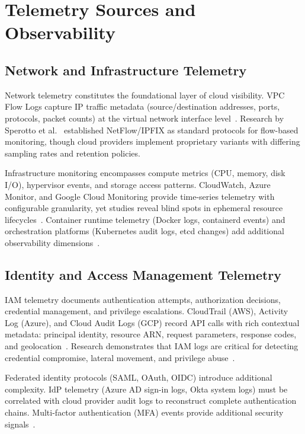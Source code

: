 \section{Telemetry Sources and Observability}\label{sec:lit-telemetry}
\subsection{Network and Infrastructure Telemetry}
Network telemetry constitutes the foundational layer of cloud visibility. VPC Flow Logs capture IP traffic metadata (source/destination addresses, ports, protocols, packet counts) at the virtual network interface level~\cite{awscloudtrail2023}. Research by Sperotto et al.~\cite{sperotto2010netflow} established NetFlow/IPFIX as standard protocols for flow-based monitoring, though cloud providers implement proprietary variants with differing sampling rates and retention policies.

Infrastructure monitoring encompasses compute metrics (CPU, memory, disk I/O), hypervisor events, and storage access patterns. CloudWatch, Azure Monitor, and Google Cloud Monitoring provide time-series telemetry with configurable granularity, yet studies reveal blind spots in ephemeral resource lifecycles~\cite{lee2018cloudmonitoring}. Container runtime telemetry (Docker logs, containerd events) and orchestration platforms (Kubernetes audit logs, etcd changes) add additional observability dimensions~\cite{burns2019kubernetes}.

\subsection{Identity and Access Management Telemetry}
IAM telemetry documents authentication attempts, authorization decisions, credential management, and privilege escalations. CloudTrail (AWS), Activity Log (Azure), and Cloud Audit Logs (GCP) record API calls with rich contextual metadata: principal identity, resource ARN, request parameters, response codes, and geolocation~\cite{awscloudtrail2023}. Research demonstrates that IAM logs are critical for detecting credential compromise, lateral movement, and privilege abuse~\cite{sun2018iamanalysis}.

Federated identity protocols (SAML, OAuth, OIDC) introduce additional complexity. IdP telemetry (Azure AD sign-in logs, Okta system logs) must be correlated with cloud provider audit logs to reconstruct complete authentication chains. Multi-factor authentication (MFA) events provide additional security signals~\cite{ometov2018mfa}.

